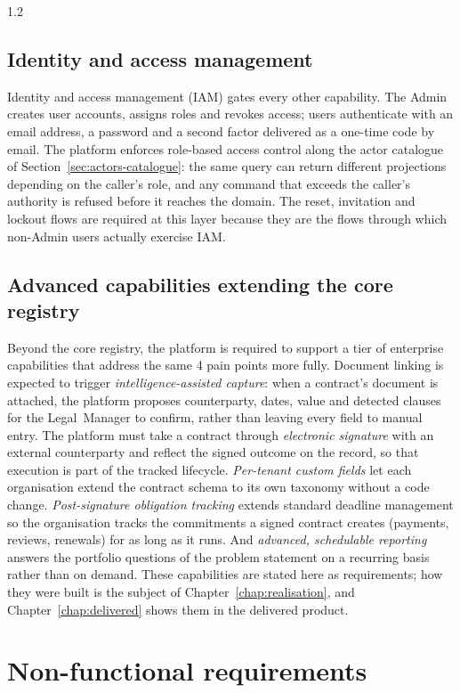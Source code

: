 \begin{spacing}{1.2}
\subsection{Identity and access management}
Identity and access management (IAM) gates every other capability.
The Admin creates user accounts, assigns roles and revokes
access; users authenticate with an email address, a password and a
second factor delivered as a one-time code by email. The platform enforces role-based access
control along the actor catalogue of
Section~\ref{sec:actors-catalogue}: the same query can return different
projections depending on the caller's role, and any command that
exceeds the caller's authority is refused before it reaches the domain.
The reset, invitation and lockout flows are required at this layer
because they are the flows through which non-Admin users actually
exercise IAM.

\subsection{Advanced capabilities extending the core registry}
\label{sec:fr-enterprise}
Beyond the core registry, the platform is required to support a tier of
enterprise capabilities that address the same 4 pain
points more fully. Document linking is expected to trigger \textit{intelligence-assisted
capture}: when a contract's document is attached, the platform proposes
counterparty, dates, value and detected clauses for the Legal~Manager to
confirm, rather than leaving every field to manual entry. The platform must
take a contract through \textit{electronic signature} with an external
counterparty and reflect the signed outcome on the record, so that execution
is part of the tracked lifecycle.
\textit{Per-tenant custom fields} let each organisation extend the contract
schema to its own taxonomy without a code change. \textit{Post-signature
obligation tracking} extends standard deadline management so the
organisation tracks the commitments a signed contract creates (payments,
reviews, renewals) for as long as it runs. And \textit{advanced, schedulable
reporting} answers the portfolio questions of the problem statement on a
recurring basis rather than on demand. These capabilities are stated here
as requirements; how they were built is the subject of
Chapter~\ref{chap:realisation}, and Chapter~\ref{chap:delivered} shows
them in the delivered product.

\section{Non-functional requirements}


\end{spacing}
